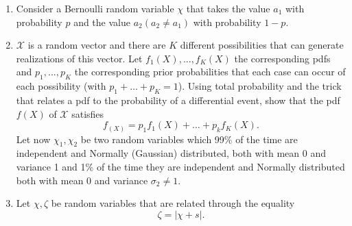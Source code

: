 \documentclass[letter, 12pt]{article}
\begin{document}
\begin{enumerate}[wide = 0pt, label = \textbf{Problem \arabic*:}]
		\item {Consider a Bernoulli random variable $ \chi $ that takes the value $ a_1 $ with probability $ p $ and the
			value $ a_2 (a_2 \ne a_1 ) $ with probability $ 1 −p $. }
	
		\item {$ \mathcal{X} $ is a random vector and there are $ K $ different possibilities that can generate realizations of this
			vector. Let $ f_1 (X), . . . , f_K (X) $ the corresponding pdfs and $ p_1 , . . . , p_K $ the corresponding prior probabilities
			that each case can occur of each possibility (with $ p_1 + \dots + p_K = 1 $). Using total probability and the trick
			that relates a pdf to the probability of a differential event, show that the pdf $ f (X) $ of $ \mathcal{X} $ satisfies \[ f_(X) = p_1 f_1 (X) + \dots + p_k f_K (X). \] Let now $ \chi_1 , \chi_2 $ be two random variables which 99\% of the time are independent and Normally (Gaussian)
			distributed, both with mean 0 and variance 1 and 1\% of the time they are independent and Normally
			distributed both with mean 0 and variance $ \sigma_2 \ne 1 $.}
	
		\item {Let $ \chi, \zeta $ be random variables that are related through the equality \[ \zeta = |\chi + s|. \]}
\end{enumerate}
\end{document}
